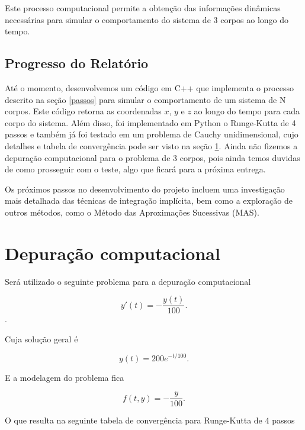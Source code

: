 \documentclass[a4paper, 12pt]{article} %
\begin{document}
Este processo computacional permite a obtenção das informações dinâmicas necessárias para simular o comportamento do sistema de 3 corpos ao longo do tempo.

\subsection{Progresso do Relatório}
Até o momento, desenvolvemos um código em C++ que implementa o processo descrito na seção \ref{passos} para simular o comportamento de um sistema de N corpos. Este código retorna as coordenadas ${x}$, ${y}$ e ${z}$ ao longo do tempo para cada corpo do sistema. Além disso, foi implementado em Python o Runge-Kutta de 4 passos e também já foi testado em um problema de Cauchy unidimensional, cujo detalhes e tabela de convergência pode ser visto na seção \ref{sec:depuracao}. Ainda não fizemos a depuração computacional para o problema de 3 corpos, pois ainda temos duvidas de como prosseguir com o teste, algo que ficará para a próxima entrega. 

Os próximos passos no desenvolvimento do projeto incluem uma investigação mais detalhada das técnicas de integração implícita, bem como a exploração de outros métodos, como o Método das Aproximações Sucessivas (MAS).


\section{Depuração computacional}\label{sec:depuracao}
Será utilizado o seguinte problema para a depuração computacional

\begin{equation}\label{eq:1}
    y'(t)=-\frac{y(t)}{100}.
\end{equation}.

Cuja solução geral é

\begin{equation}\label{eq:2}
    y(t)=200e^{-{t/100}}.
\end{equation}

E a modelagem do problema fica 

\begin{equation}\label{eq:3}
    f(t,y)= -\frac{y}{100}.
\end{equation}

O que resulta na seguinte tabela de convergência para Runge-Kutta de 4 passos
\end{document}
